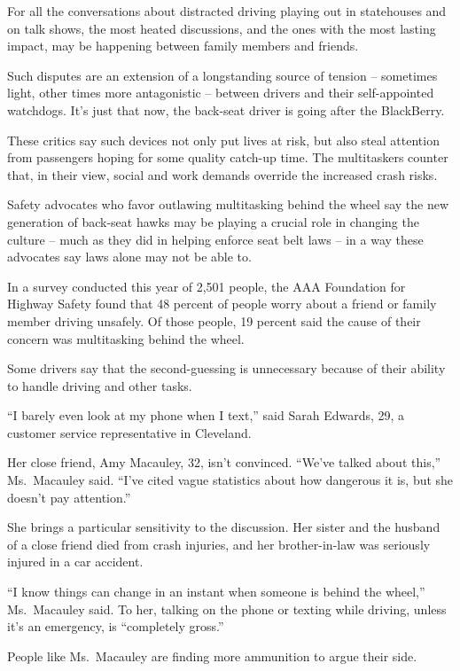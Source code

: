 ﻿\documentclass[12pt]{article}
\begin{document}
For all the conversations about distracted driving playing out in statehouses and on talk shows, the
most heated discussions, and the ones with the most lasting impact, may be happening between family
members and friends.

Such disputes are an extension of a longstanding source of tension -- sometimes light, other times
more antagonistic -- between drivers and their self-appointed watchdogs. It's just that now, the
back-seat driver is going after the BlackBerry.

These critics say such devices not only put lives at risk, but also steal attention from passengers
hoping for some quality catch-up time. The multitaskers counter that, in their view, social and work
demands override the increased crash risks.

Safety advocates who favor outlawing multitasking behind the wheel say the new generation of
back-seat hawks may be playing a crucial role in changing the culture -- much as they did in helping
enforce seat belt laws -- in a way these advocates say laws alone may not be able to.

In a survey conducted this year of 2,501 people, the AAA Foundation for Highway Safety found that 48
percent of people worry about a friend or family member driving unsafely. Of those people, 19
percent said the cause of their concern was multitasking behind the wheel.

Some drivers say that the second-guessing is unnecessary because of their ability to handle driving
and other tasks.

``I barely even look at my phone when I text,'' said Sarah Edwards, 29, a customer service
representative in Cleveland.

Her close friend, Amy Macauley, 32, isn't convinced. ``We've talked about this,'' Ms.~Macauley said.
``I've cited vague\cite{vague} statistics about how dangerous it is, but she doesn't pay
attention.''

She brings a particular sensitivity to the discussion. Her sister and the husband of a close friend
died from crash injuries, and her brother-in-law was seriously injured in a car accident.

``I know things can change in an instant when someone is behind the wheel,'' Ms.~Macauley said. To
her, talking on the phone or texting while driving, unless it's an emergency, is ``completely
gross.''

People like Ms.~Macauley are finding more ammunition to argue their side.
\end{document}

